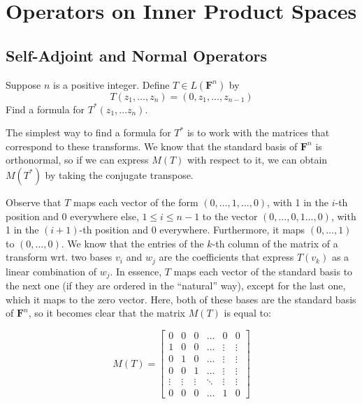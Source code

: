 \chapter{Operators on Inner Product Spaces}

\section{Self-Adjoint and Normal Operators}

\begin{exercise}{1}
    Suppose $n$ is a positive integer. Define $T \in L(\mathbf{F}^n)$ by 
    $$ T(z_1, \ldots, z_n) = (0, z_1, \ldots, z_{n-1})$$
    Find a formula for $T^*(z_1, \ldots z_n)$.
\end{exercise}

\begin{solution}

The simplest way to find a formula for $T^*$ is to work with the matrices that correspond to these transforms. We know that the standard basis of $\mathbf{F}^n$ is orthonormal, so if we can express $M(T)$ with respect to it, we can obtain $M(T^*)$ by taking the conjugate transpose. 

Observe that $T$ maps each vector of the form $(0, \ldots, 1, \ldots, 0)$, with 1 in the $i$-th position and 0 everywhere else, $1 \leq i \leq n - 1$ to the vector $(0, \ldots, 0, 1 \ldots, 0)$, with 1 in the $(i+1)$-th position and 0 everywhere. Furthermore, it maps $(0, \ldots, 1)$ to $(0, \ldots, 0)$. We know that the entries of the $k$-th column of the matrix of a transform wrt. two bases $v_i$ and $w_j$ are the coefficients that express $T(v_k)$ as a linear combination of $w_j$. In essence, $T$ maps each vector of the standard basis to the next one (if they are ordered in the ``natural'' way), except for the last one, which it maps to the zero vector. Here, both of these bases are the standard basis of $\mathbf{F}^n$, so it becomes clear that the matrix $M(T)$ is equal to:

$$M(T) = \begin{bmatrix} 
    0      & 0      & 0      & \ldots & 0      & 0 \\ 
    1      & 0      & 0      & \ldots & \vdots & \vdots \\ 
    0      & 1      & 0      & \ldots & \vdots & \vdots \\ 
    0      & 0      & 1      & \ldots & \vdots & \vdots \\
    \vdots & \vdots & \vdots & \ddots & \vdots & \vdots \\
    0      &  0     & 0      & \ldots & 1      & 0 \end{bmatrix}$$


\end{solution}
